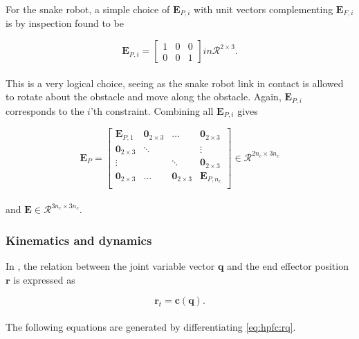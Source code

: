 For the snake robot, a simple choice of $\mathbf{E}_{P,i}$ with unit vectors complementing $\mathbf{E}_{F,i}$ is by inspection found to be

\begin{equation}\label{eq:dhpfc_EPi}
    \mathbf{E}_{P,i} = 
    \begin{bmatrix}
        1 & 0 & 0 \\
        0 & 0 & 1
    \end{bmatrix} in \mathcal{R}^{2\times 3}.
\end{equation}
\\
This is a very logical choice, seeing as the snake robot link in contact is allowed to rotate about the obstacle and move along the obstacle.
Again, $\mathbf{E}_{P,i}$ corresponds to the $i$'th constraint. Combining all $\mathbf{E}_{P,i}$ gives 

\begin{equation}
    \mathbf{E}_P = 
    \begin{bmatrix}
        \mathbf{E}_{P,1} & \mathbf{0}_{2\times3} & \dots & \mathbf{0}_{2\times3} \\
        \mathbf{0}_{2\times3} & \ddots & & \vdots \\
        \vdots & & \ddots & \mathbf{0}_{2\times3} \\
        \mathbf{0}_{2\times3} & \dots & \mathbf{0}_{2\times3} & \mathbf{E}_{P,n_c} \\
    \end{bmatrix} \in \mathcal{R}^{2 n_c \times 3 n_c}
\end{equation}
\\
and $\mathbf{E} \in \mathcal{R}^{3 n_c \times 3 n_c}$.


\subsubsection{Kinematics and dynamics}

In \cite{yoshikawa1987dynamic}, the relation between the joint variable vector $\mathbf{q}$ and the end effector position $\mathbf{r}$ is expressed as

\begin{equation}\label{eq:hpfc:rq}
    \mathbf{r}_t = \mathbf{c(q)}.
\end{equation}
\\
The following equations are generated by differentiating \ref{eq:hpfc:rq}.

